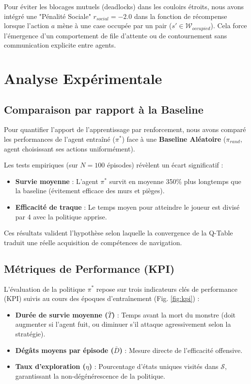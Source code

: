 \documentclass[12pt,a4paper]{article}
\begin{document}
Pour éviter les blocages mutuels (deadlocks) dans les couloirs étroits, nous avons intégré une "Pénalité Sociale" $r_{social} = -2.0$ dans la fonction de récompense lorsque l'action $a$ mène à une case occupée par un pair ($s' \in \mathcal{W}_{occupied}$). Cela force l'émergence d'un comportement de file d'attente ou de contournement sans communication explicite entre agents.

\section{Analyse Expérimentale}

\subsection{Comparaison par rapport à la Baseline}
Pour quantifier l'apport de l'apprentissage par renforcement, nous avons comparé les performances de l'agent entraîné ($\pi^*$) face à une \textbf{Baseline Aléatoire} ($\pi_{rand}$, agent choisissant ses actions uniformément).

Les tests empiriques (sur $N=100$ épisodes) révèlent un écart significatif :
\begin{itemize}
    \item \textbf{Survie moyenne} : L'agent $\pi^*$ survit en moyenne 350\% plus longtemps que la baseline (évitement efficace des murs et pièges).
    \item \textbf{Efficacité de traque} : Le temps moyen pour atteindre le joueur est divisé par 4 avec la politique apprise.
\end{itemize}
Ces résultats valident l'hypothèse selon laquelle la convergence de la Q-Table traduit une réelle acquisition de compétences de navigation.

\subsection{Métriques de Performance (KPI)}
L'évaluation de la politique $\pi^*$ repose sur trois indicateurs clés de performance (KPI) suivis au cours des époques d'entraînement (Fig. \ref{fig:kpi}) :
\begin{itemize}
    \item \textbf{Durée de survie moyenne ($\bar{T}$)} : Temps avant la mort du monstre (doit augmenter si l'agent fuit, ou diminuer s'il attaque agressivement selon la stratégie).
    \item \textbf{Dégâts moyens par épisode ($\bar{D}$)} : Mesure directe de l'efficacité offensive.
    \item \textbf{Taux d'exploration ($\eta$)} : Pourcentage d'états uniques visités dans $\mathcal{S}$, garantissant la non-dégénérescence de la politique.
\end{itemize}
\end{document}
